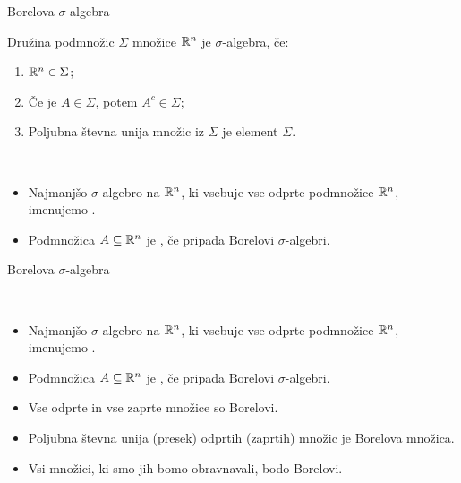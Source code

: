 \documentclass[10pt]{beamer}
\begin{document}
\begin{frame}{Borelova \(\sigma\)-algebra}
    \begin{definicija} 
        Družina podmnožic \(\Sigma\) množice \(\mathbb{R}^n\) je \(\sigma\)-algebra, če:
        \begin{enumerate}
            \item \(\mathbb{R}^n \in \Sigma\);
            \item Če je \(A \in \Sigma\), potem \(A^c \in \Sigma\);
            \item Poljubna števna unija množic iz \(\Sigma\) je element \(\Sigma\).
        \end{enumerate} 
    \end{definicija}

    \pause

    \begin{definicija} \ 
        \begin{itemize}
            \item Najmanjšo \(\sigma\)-algebro na \(\mathbb{R}^n\), ki vsebuje vse odprte podmnožice \(\mathbb{R}^n\), imenujemo .
            \item Podmnožica \(A \subseteq \mathbb{R}^n\) je \df{Borelova}, če pripada Borelovi \(\sigma\)-algebri.
        \end{itemize}
    \end{definicija}
\end{frame}

\begin{frame}{Borelova \(\sigma\)-algebra}
    \begin{definicija} \ 
        \begin{itemize}
            \item Najmanjšo \(\sigma\)-algebro na \(\mathbb{R}^n\), ki vsebuje vse odprte podmnožice \(\mathbb{R}^n\), imenujemo .
            \item Podmnožica \(A \subseteq \mathbb{R}^n\) je , če pripada Borelovi \(\sigma\)-algebri.
        \end{itemize}
    \end{definicija}

    \begin{opomba}
        \begin{itemize}
            \item Vse odprte in vse zaprte množice so Borelovi.
            \item Poljubna števna unija (presek) odprtih (zaprtih) množic je Borelova množica. 
            \item Vsi množici, ki smo jih bomo obravnavali, bodo Borelovi.
        \end{itemize}
    \end{opomba}
\end{frame}
\end{document}
